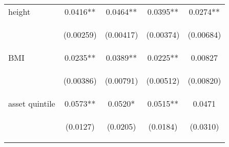 \documentclass{article}[11pt,subeqn]
\begin{document}
\begin{spacing}{1.5}
\begin{table}[htpb!]
\begin{center}
\begin{tabular}{lcccc}
height & 0.0416** & 0.0464** & 0.0395** & 0.0274** \\
\vspace{4pt} & \begin{footnotesize}(0.00259)\end{footnotesize} & \begin{footnotesize}(0.00417)\end{footnotesize} & \begin{footnotesize}(0.00374)\end{footnotesize} & \begin{footnotesize}(0.00684)\end{footnotesize} \\
BMI & 0.0235** & 0.0389** & 0.0225** & 0.00827 \\
\vspace{4pt} & \begin{footnotesize}(0.00386)\end{footnotesize} & \begin{footnotesize}(0.00791)\end{footnotesize} & \begin{footnotesize}(0.00512)\end{footnotesize} & \begin{footnotesize}(0.00820)\end{footnotesize} \\
asset quintile & 0.0573** & 0.0520* & 0.0515** & 0.0471 \\
\vspace{4pt} & \begin{footnotesize}(0.0127)\end{footnotesize} & \begin{footnotesize}(0.0205)\end{footnotesize} & \begin{footnotesize}(0.0184)\end{footnotesize} & \begin{footnotesize}(0.0310)\end{footnotesize} \\

\end{tabular}
\end{center}
\end{table}
\end{spacing}
\end{document}

